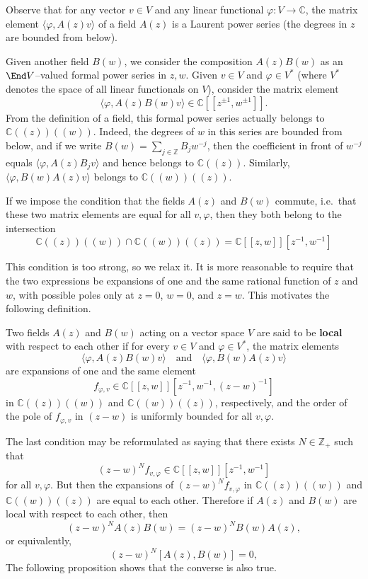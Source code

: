 \documentclass[12pt]{article}
\begin{document}
Observe that for any vector $v \in V$ and any linear functional $\varphi : V \to \mathbb{C}$, the matrix element $\langle \varphi, A(z)v \rangle$ of a field $A(z)$ is a Laurent power series (the degrees in $z$ are bounded from below).

Given another field $B(w)$, we consider the composition $A(z)B(w)$ as an $\End V$–valued formal power series in $z,w$.
Given $v \in V$ and $\varphi \in V^*$ (where $V^*$ denotes the space of all linear functionals on $V$), consider the matrix element
\[
    \langle \varphi, A(z)B(w)v \rangle \in \mathbb{C}[[z^{\pm1}, w^{\pm1}]].
\]
From the definition of a field, this formal power series actually belongs to $\mathbb{C}((z))((w))$.
Indeed, the degrees of $w$ in this series are bounded from below, and if we write $B(w) = \sum_{j \in \mathbb{Z}} B_j w^{-j}$, then the coefficient in front of $w^{-j}$ equals $\langle \varphi, A(z)B_j v\rangle$ and hence belongs to $\mathbb{C}((z))$.
Similarly, $\langle \varphi, B(w)A(z)v\rangle$ belongs to $\mathbb{C}((w))((z))$.

If we impose the condition that the fields $A(z)$ and $B(w)$ commute, i.e.\ that these two matrix elements are equal for all $v,\varphi$, then they both belong to the intersection \[\mathbb{C}((z))((w)) \cap \mathbb{C}((w))((z)) = \mathbb{C}[[z,w]][z^{-1},w^{-1}]\]

This condition is too strong, so we relax it.
It is more reasonable to require that the two expressions be expansions of one and the same rational function of $z$ and $w$, with possible poles only at $z=0$, $w=0$, and $z=w$.
This motivates the following definition.

\begin{definition}
    Two fields $A(z)$ and $B(w)$ acting on a vector space $V$ are said to be \textbf{local} with respect to each other if for every $v \in V$ and $\varphi \in V^*$, the matrix elements
    \[
        \langle \varphi, A(z)B(w)v \rangle \quad \text{and} \quad \langle \varphi, B(w)A(z)v \rangle
    \]
    are expansions of one and the same element
    \[
        f_{\varphi,v} \in \mathbb{C}[[z,w]][z^{-1},w^{-1},(z-w)^{-1}]
    \]
    in $\mathbb{C}((z))((w))$ and $\mathbb{C}((w))((z))$, respectively, and the order of the pole of $f_{\varphi,v}$ in $(z-w)$ is uniformly bounded for all $v,\varphi$.
\end{definition}

The last condition may be reformulated as saying that there exists
$N \in \mathbb{Z}_+$ such that
\[
    (z-w)^N f_{v,\varphi} \in \mathbb{C}[[z,w]][z^{-1},w^{-1}]
\]
for all $v,\varphi$. But then the expansions of $(z-w)^N f_{v,\varphi}$ in
$\mathbb{C}((z))((w))$ and $\mathbb{C}((w))((z))$ are equal to each other.
Therefore if $A(z)$ and $B(w)$ are local with respect to each other, then
\[
    (z-w)^N A(z)B(w) = (z-w)^N B(w)A(z),
\]
or equivalently,
\[
    (z-w)^N [A(z),B(w)] = 0,
\]
The following proposition shows that the converse is also true.
\end{document}
